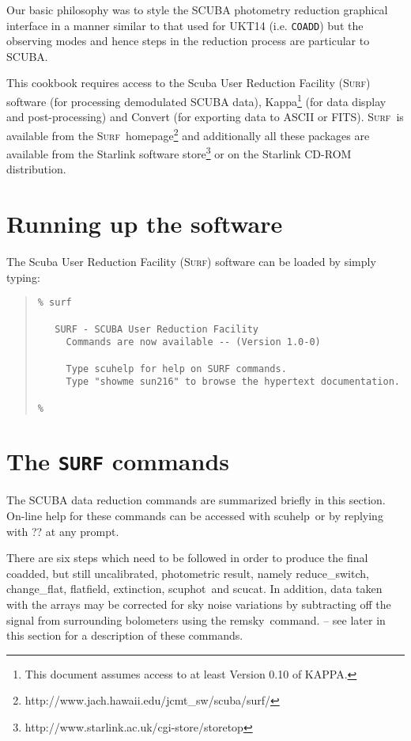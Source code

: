 \documentclass[twoside,11pt,fleqn]{article}
\newenvironment{myquote}{\begin{quote}\begin{small}}{\end{small}\end{quote}}
\newcommand{\Kappa}{\xref{{\sc Kappa}}{sun95}{}}
\newcommand{\convert}{\xref{{\sc Convert}}{sun55}{}}
\newcommand{\surf}{\xref{\textsc{Surf}}{sun216}{}}
\newcommand{\task}[1]{{\sf #1}}
\newcommand{\chgflat}{\xref{\task{change\_flat}}{sun216}{CHANGE_FLAT}}
\newcommand{\resw}{\xref{\task{reduce\_switch}}{sun216}{REDUCE_SWITCH}}
\newcommand{\flatf}{\xref{\task{flatfield}}{sun216}{FLATFIELD}}
\newcommand{\scuphot}{\xref{\task{scuphot}}{sun216}{SCUPHOT}}
\newcommand{\ext}{\xref{\task{extinction}}{sun216}{EXTINCTION}}
\newcommand{\scuhelp}{\xref{\task{scuhelp}}{sun216}{SCUHELP}}
\newcommand{\remsky}{\xref{\task{remsky}}{sun216}{REMSKY}}
\newcommand{\scucat}{\xref{\task{scucat}}{sun216}{SCUCAT}}
\newcommand{\htmladdnormallinkfoot}[2]{#1\footnote{#2}}
\newcommand{\htmladdnormallink}[2]{#1}
\newcommand{\xref}[3]{#1}
\begin{document}
Our basic philosophy was to style the SCUBA photometry reduction
graphical interface in a manner similar to that used for UKT14 \cite{ukt14}
(i.e. {\tt COADD}) but the observing modes and hence steps in the
reduction process are particular to SCUBA.

This cookbook requires access to the Scuba User Reduction Facility (\surf) software
\cite{surf} (for processing demodulated SCUBA data), \Kappa \cite{kappa}\footnote{This
document assumes access to at least Version 0.10 of KAPPA.} (for data display
and post-processing) and \convert\cite{convert} (for exporting data to ASCII or FITS).
\surf\ is available from the \surf\
\htmladdnormallinkfoot{homepage}{http://www.jach.hawaii.edu/jcmt\_sw/scuba/surf/}
and additionally all these packages are available from the
\htmladdnormallinkfoot{Starlink software store}{http://www.starlink.ac.uk/cgi-store/storetop}
or on the \htmladdnormallink{Starlink}{http://www.starlink.ac.uk} CD-ROM distribution.

\section{Running up the software}

The Scuba User Reduction Facility (\surf) software can be loaded
by simply typing:

\begin{myquote}
\begin{verbatim}
% surf

   SURF - SCUBA User Reduction Facility
     Commands are now available -- (Version 1.0-0)

     Type scuhelp for help on SURF commands.
     Type "showme sun216" to browse the hypertext documentation.

%
\end{verbatim}
\end{myquote}

\section{The {\tt SURF} commands}

The SCUBA data reduction commands are summarized briefly in this
section. On-line help for these commands can be accessed with \scuhelp\
or by replying with ?? at any prompt.

There are six steps which need to be followed in order to produce the final
coadded, but still uncalibrated, photometric result, namely \resw, \chgflat,
\flatf, \ext, \scuphot\ and \scucat. In addition, data taken with the arrays
may be corrected for sky noise variations by subtracting off the signal from
surrounding bolometers using the \remsky\ command. -- see later in this
section for a description of these commands.
\end{document}
